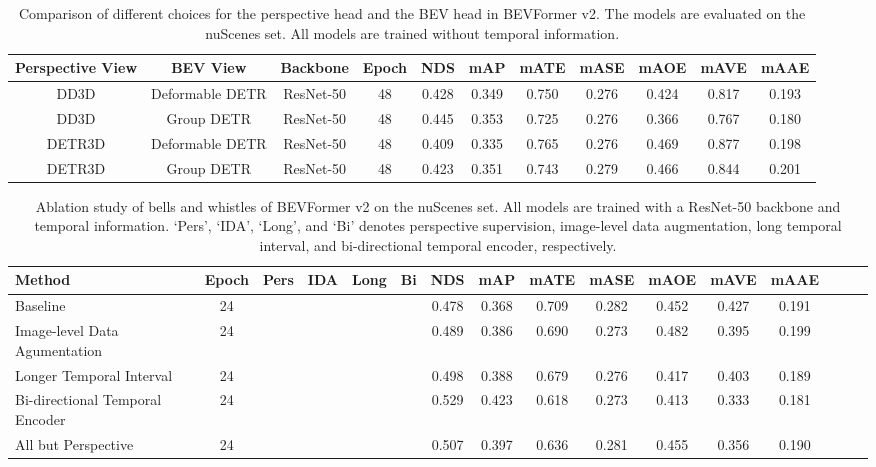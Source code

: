 \documentclass[10pt,twocolumn,letterpaper]{article}
\begin{document}
\setlength{\tabcolsep}{3pt}
\setlength{\doublerulesep}{2\arrayrulewidth}
\renewcommand{\arraystretch}{1.1}
\begin{table*}[ht]
    \caption{Comparison of different choices for the perspective head and the BEV head in BEVFormer v2. The models are evaluated on the nuScenes  set. All models are trained without temporal information.}
    \label{table:detector_choice_for_two_view}
    \centering
    \vspace{-5pt}
    \begin{tabular}{cc|c|c|cc|ccccc}
        \toprule
        Perspective View & BEV View & Backbone & Epoch & NDS & mAP & mATE & mASE & mAOE & mAVE & mAAE   \\ 
        \midrule 
        DD3D & Deformable DETR & ResNet-50 & 48 & 0.428 & 0.349 & 0.750 & 0.276 & 0.424 & 0.817 & 0.193 \\ 
        DD3D & Group DETR & ResNet-50 & 48 & 0.445 & 0.353 & 0.725 & 0.276 & 0.366 & 0.767 & 0.180 \\ 
         DETR3D & Deformable DETR & ResNet-50 & 48 & 0.409 & 0.335 & 0.765 & 0.276 & 0.469 & 0.877 & 0.198 \\ 
        DETR3D & Group DETR & ResNet-50 & 48 & 0.423 & 0.351 & 0.743 & 0.279 & 0.466 & 0.844 & 0.201 \\ 
        \midrule
        \bottomrule
    \end{tabular}
    
\end{table*} \let\ck\checkmark

\setlength{\tabcolsep}{3pt}
\setlength{\doublerulesep}{2\arrayrulewidth}
\renewcommand{\arraystretch}{1.0}
\begin{table*}[t]
    \caption{Ablation study of bells and whistles of BEVFormer v2 on the nuScenes  set. All models are trained with a ResNet-50 backbone and temporal information. `Pers', `IDA', `Long', and `Bi' denotes perspective supervision, image-level data augmentation, long temporal interval, and bi-directional temporal encoder, respectively.}
    \label{table:trick}
    \centering
    \vspace{-5pt}
    \begin{tabular}{l|c|cccc|cc|cc|cccccc}
        \toprule
        Method & Epoch & Pers & IDA & Long & Bi & NDS & mAP & mATE & mASE & mAOE & mAVE & mAAE   \\ 
        \midrule
        Baseline & 24 & \ck & & & & 0.478 & 0.368 & 0.709 & 0.282 & 0.452 & 0.427 & 0.191 \\ 
        Image-level Data Agumentation & 24 & \ck & \ck & & & 0.489 & 0.386 & 0.690 & 0.273 & 0.482 & 0.395 & 0.199 \\
Longer Temporal Interval & 24 & \ck & \ck & \ck & & 0.498 & 0.388 & 0.679 & 0.276 & 0.417 & 0.403 & 0.189 \\
Bi-directional Temporal Encoder & 24 & \ck & \ck & \ck & \ck & 0.529 & 0.423 & 0.618 & 0.273 & 0.413 & 0.333 & 0.181 \\
        All but Perspective & 24 & & \ck & \ck & \ck & 0.507 & 0.397 & 0.636 & 0.281 & 0.455 & 0.356 & 0.190 \\
        \bottomrule
    \end{tabular}
    
\end{table*} 
\end{document}
